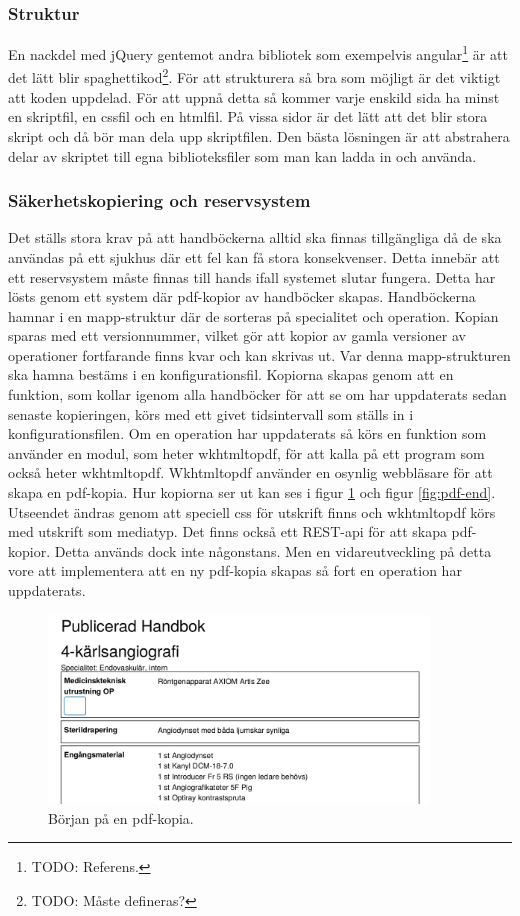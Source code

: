 \subsubsection{Struktur}
En nackdel med jQuery gentemot andra bibliotek som exempelvis angular\footnote{TODO: Referens.} är att det lätt blir spaghettikod\footnote{TODO: Måste defineras?}.
För att strukturera så bra som möjligt är det viktigt att koden uppdelad.
För att uppnå detta så kommer varje enskild sida ha minst en skriptfil, en cssfil och en htmlfil.
På vissa sidor är det lätt att det blir stora skript och då bör man dela upp skriptfilen.
Den bästa lösningen är att abstrahera delar av skriptet till egna biblioteksfiler som man kan ladda in och använda.

\subsubsection{Säkerhetskopiering och reservsystem}
Det ställs stora krav på att handböckerna alltid ska finnas tillgängliga då de ska användas på ett sjukhus där ett fel kan få stora konsekvenser. Detta innebär att ett reservsystem måste finnas till hands ifall systemet slutar fungera. Detta har lösts genom ett system där pdf-kopior av handböcker skapas. Handböckerna hamnar i en mapp-struktur där de sorteras på specialitet och operation. Kopian sparas med ett versionnummer, vilket gör att kopior av gamla versioner av operationer fortfarande finns kvar och kan skrivas ut. Var denna mapp-strukturen ska hamna bestäms i en konfigurationsfil.
Kopiorna skapas genom att en funktion, som kollar igenom alla handböcker för att se om har uppdaterats sedan senaste kopieringen, körs med ett givet tidsintervall som ställs in i konfigurationsfilen. Om en operation har uppdaterats så körs en funktion som använder en modul, som heter wkhtmltopdf, för att kalla på ett program som också heter wkhtmltopdf. Wkhtmltopdf använder en osynlig webbläsare för att skapa en pdf-kopia. Hur kopiorna ser ut kan ses i figur \ref{fig:pdf-start} och figur \ref{fig:pdf-end}. Utseendet ändras genom att speciell css för utskrift finns och wkhtmltopdf körs med utskrift som mediatyp. 
Det finns också ett REST-api för att skapa pdf-kopior. Detta används dock inte någonstans. Men en vidareutveckling på detta vore att implementera att en ny pdf-kopia skapas så fort en operation har uppdaterats. 

\begin{figure}
  \centering
  \includegraphics[width=0.9\textwidth]{images/pdf-start.png}
  \caption{Början på en pdf-kopia.}
  \label{fig:pdf-start}
\end{figure}

